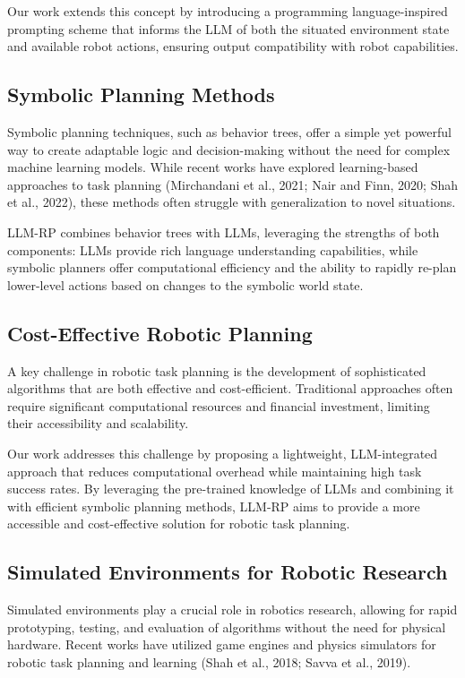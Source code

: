 \documentclass[pdflatex,sn-mathphys-num]{sn-jnl}%
\theoremstyle{thmstyleone}
\theoremstyle{thmstyletwo}%
\theoremstyle{thmstylethree}%
\begin{document}
Our work extends this concept by introducing a programming language-inspired prompting scheme that informs the LLM of both the situated environment state and available robot actions, ensuring output compatibility with robot capabilities.

\subsection{Symbolic Planning Methods}

Symbolic planning techniques, such as behavior trees, offer a simple yet powerful way to create adaptable logic and decision-making without the need for complex machine learning models. While recent works have explored learning-based approaches to task planning (Mirchandani et al., 2021; Nair and Finn, 2020; Shah et al., 2022), these methods often struggle with generalization to novel situations.

LLM-RP combines behavior trees with LLMs, leveraging the strengths of both components: LLMs provide rich language understanding capabilities, while symbolic planners offer computational efficiency and the ability to rapidly re-plan lower-level actions based on changes to the symbolic world state.

\subsection{Cost-Effective Robotic Planning}

A key challenge in robotic task planning is the development of sophisticated algorithms that are both effective and cost-efficient. Traditional approaches often require significant computational resources and financial investment, limiting their accessibility and scalability.

Our work addresses this challenge by proposing a lightweight, LLM-integrated approach that reduces computational overhead while maintaining high task success rates. By leveraging the pre-trained knowledge of LLMs and combining it with efficient symbolic planning methods, LLM-RP aims to provide a more accessible and cost-effective solution for robotic task planning.

\subsection{Simulated Environments for Robotic Research}

Simulated environments play a crucial role in robotics research, allowing for rapid prototyping, testing, and evaluation of algorithms without the need for physical hardware. Recent works have utilized game engines and physics simulators for robotic task planning and learning (Shah et al., 2018; Savva et al., 2019).
\end{document}
